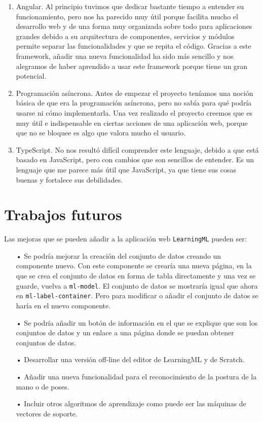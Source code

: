 \documentclass[a4paper, 12pt]{book}
\begin{document}
\begin{enumerate}
  \item Angular. Al principio tuvimos que dedicar bastante tiempo a entender su funcionamiento, pero nos ha parecido muy útil porque facilita mucho el desarrollo web y de una forma muy organizada sobre todo para aplicaciones grandes debido a su arquitectura de componentes, servicios y módulos permite separar las funcionalidades y que se repita el código. Gracias a este framework, añadir una nueva funcionalidad ha sido más sencillo y nos alegramos de haber aprendido a usar este framework porque tiene un gran potencial.
  
  \item Programación asíncrona. Antes de empezar el proyecto teníamos una noción básica de que era la programación asíncrona, pero no sabía para qué podría usarse ni cómo implementarla. Una vez realizado el proyecto creemos que es muy útil e indispensable en ciertas acciones de una aplicación web, porque que no se bloquee es algo que valora mucho el usuario.
  
  \item TypeScript. No nos resultó difícil comprender este lenguaje, debido a que está basado en JavaScript, pero con cambios que son sencillos de entender. Es un lenguaje que me parece más útil que JavaScript, ya que tiene sus cosas buenas y fortalece sus debilidades.
\end{enumerate}


\section{Trabajos futuros}
\label{sec:trabajos_futuros}

Las mejoras que se pueden añadir a la aplicación web \texttt{LearningML} pueden ser:

\begin{itemize}
 \item[•] Se podría mejorar la creación del conjunto de datos creando un componente nuevo. Con este componente se crearía una nueva página, en la que se crea el conjunto de datos en forma de tabla directamente y una vez se guarde, vuelva a \texttt{ml-model}. El conjunto de datos se mostraría igual que ahora en \texttt{ml-label-container}. Pero para modificar o añadir el conjunto de datos se haría en el nuevo componente.
 
 \item[•] Se podría añadir un botón de información en el que se explique que son los conjuntos de datos y un enlace a una página donde se puedan obtener conjuntos de datos.
 
 \item[•] Desarrollar una versión off-line del editor de LearningML y de Scratch.
 
 \item[•] Añadir una nueva funcionalidad para el reconocimiento de la postura de la mano o de poses.
 
 \item[•] Incluir otros algoritmos de aprendizaje como puede ser las máquinas de vectores de soporte.
 \end{itemize} 
\end{document}
